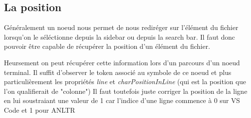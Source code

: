 \documentclass[
    iict, %
    il, %
]{heig-tb}
\begin{document}
\subsection{La position}

Généralement un noeud nous permet de nous rediréger sur l'élément du fichier lorsqu'on le séléctionne depuis la sidebar ou depuis la search bar. %
Il faut donc pouvoir être capable de récupérer la position d'un élément du fichier.

Heursement on peut récupérer cette information lors d'un parcours d'un noeud terminal.
Il suffit d'observer le token associé au symbole de ce noeud et plus particulièrement les
propriétés \emph{line} et \emph{charPositionInLine} (qui est la position que l'on qualifierait de "colonne")
Il faut toutefois juste corriger la position de la ligne en lui soustraiant une valeur de 1 car l'indice d'une ligne commence à 0 sur VS Code et 1 pour ANLTR %













\end{document}

